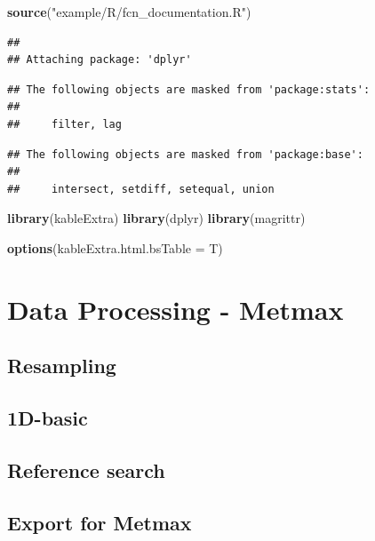 \documentclass[]{book}
\newenvironment{Shaded}{\begin{snugshade}}{\end{snugshade}}
\newcommand{\KeywordTok}[1]{\textcolor[rgb]{0.13,0.29,0.53}{\textbf{#1}}}
\newcommand{\DataTypeTok}[1]{\textcolor[rgb]{0.13,0.29,0.53}{#1}}
\newcommand{\StringTok}[1]{\textcolor[rgb]{0.31,0.60,0.02}{#1}}
\newcommand{\NormalTok}[1]{#1}
\theoremstyle{definition}
\theoremstyle{definition}
\theoremstyle{definition}
\theoremstyle{remark}
\begin{document}
\begin{Shaded}
\begin{Highlighting}[]
\KeywordTok{source}\NormalTok{(}\StringTok{"example/R/fcn_documentation.R"}\NormalTok{)}
\end{Highlighting}
\end{Shaded}

\begin{verbatim}
## 
## Attaching package: 'dplyr'
\end{verbatim}

\begin{verbatim}
## The following objects are masked from 'package:stats':
## 
##     filter, lag
\end{verbatim}

\begin{verbatim}
## The following objects are masked from 'package:base':
## 
##     intersect, setdiff, setequal, union
\end{verbatim}

\begin{Shaded}
\begin{Highlighting}[]
\KeywordTok{library}\NormalTok{(kableExtra)}
\KeywordTok{library}\NormalTok{(dplyr)}
\KeywordTok{library}\NormalTok{(magrittr)}

\KeywordTok{options}\NormalTok{(}\DataTypeTok{kableExtra.html.bsTable =}\NormalTok{ T)}
\end{Highlighting}
\end{Shaded}

\chapter{Data Processing - Metmax}\label{metmaxproc}

\section{Resampling}\label{resampling-1}

\section{1D-basic}\label{d-basic}

\section{Reference search}\label{reference-search}

\section{Export for Metmax}\label{export-for-metmax}
\end{document}
